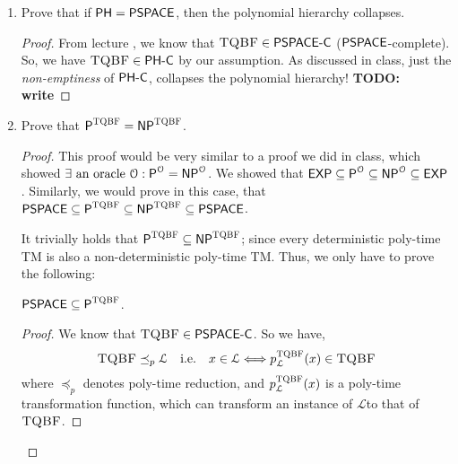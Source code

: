 \documentclass[usletter]{article}
\newcommand {\langset}[1]      {\ensuremath{\mathcal{#1}}}
\newcommand {\machine}[1]      {\ensuremath{\mathscr{#1}}}
\newcommand {\namedlangset}[1] {\ensuremath{\textnormal{\textsc{#1}}}}
\newcommand {\family}[1]       {\ensuremath{\textnormal{\textsf{#1}}}}
\newcommand {\term}[1]      {\textit{#1}}
\newcommand{\ie}{\textnormal{i.e.}}
\newcommand{\todo}[1]{{\large \textbf{TODO: #1}}}
\newcommand {\langL}          {\langset{L}}
\newcommand {\machineM}       {\machine{M}}
\begin{document}
\begin{enumerate}
\begin{proof}
    Note that, since we did not assume any order of enumeration for $\langL_m$
    in Figure \ref{diag_table}, the membership check $x_n \in \langL_n$ required
    for $\langL_{Diag}$ is effectively checking membership of an arbitrary
    string in an arbitrary language. Given the fact that these languages are
    decidable by oracle machines equipped with \namedlangset{Halt}, we can
    re-write $\langL_{Diag}$ as:
    $$
      \langL_{Diag} = \{ \left< \alpha , x \right> \mid
                         \machineM_\alpha^\namedlangset{Halt}(x) = 0 \}
    $$
    which is the (co-)\term{Halting Problem} defined on oracle machines equipped with
    \namedlangset{Halt}!
  \end{proof}

  \item Prove that if $\family{PH} = \family{PSPACE}$,
        then the polynomial hierarchy collapses.
  \begin{proof}
    From lecture \cite{lec6}, we know that
    $\namedlangset{TQBF} \in \family{PSPACE-C}$ (\family{PSPACE}-complete).
    So, we have $\namedlangset{TQBF} \in \family{PH-C}$ by our assumption.
    As discussed in class, just the \textit{non-emptiness} of \family{PH-C},
    collapses the polynomial hierarchy!
    \todo{write}
  \end{proof}

  \item Prove that
        $\family{P}^\namedlangset{TQBF} = \family{NP}^\namedlangset{TQBF}$.
  \begin{proof}
    This proof would be very similar to a proof we did in class, which showed
    $\exists \textnormal{ an oracle } \langset{O}:
      \family{P}^\langset{O} = \family{NP}^\langset{O}$.
    We showed that $\family{EXP} \subseteq \family{P}^\langset{O}
                                 \subseteq \family{NP}^\langset{O}
                                 \subseteq \family{EXP}$.
    Similarly, we would prove in this case, that
    $\family{PSPACE} \subseteq \family{P}^\namedlangset{TQBF}
                     \subseteq \family{NP}^\namedlangset{TQBF}
                     \subseteq \family{PSPACE}$.

    It trivially holds that
    $\family{P}^\namedlangset{TQBF} \subseteq \family{NP}^\namedlangset{TQBF}$;
    since every deterministic poly-time TM is also a non-deterministic poly-time
    TM. Thus, we only have to prove the following:

    \begin{claim}
      $ \family{PSPACE} \subseteq \family{P}^\namedlangset{TQBF} $.
    \end{claim}
    \begin{proof}
      We know that $\namedlangset{TQBF} \in \family{PSPACE-C}$. So we have,
      $$\namedlangset{TQBF} \preceq_p \langL \quad \ie \quad
      x \in \langL \Longleftrightarrow p_\langL^\namedlangset{TQBF} (x)
        \in \namedlangset{TQBF} $$
      where $\preceq_p$ denotes poly-time reduction, and
      $p_\langL^\namedlangset{TQBF} (x)$ is a poly-time transformation function,
      which can transform an instance of \langL to that of \namedlangset{TQBF}.


\end{proof}
\end{proof}
\end{enumerate}
\end{document}
